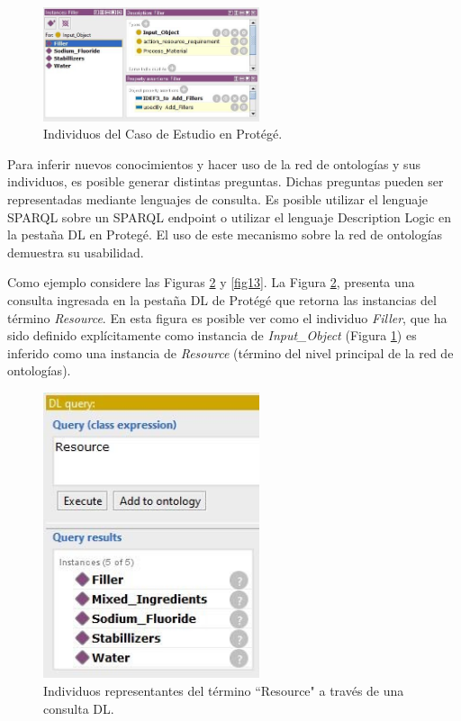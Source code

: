 \documentclass[journal]{IEEEtran}
\begin{document}
\begin{figure}[!t]
\centering
\includegraphics[width=2.5in]{figures/figure11.jpg}
\caption{Individuos del Caso de Estudio en Prot\'eg\'e.}
\label{fig11}
\end{figure}

Para inferir nuevos conocimientos y hacer uso de la red de ontolog\'ias y sus individuos, es posible generar distintas preguntas. Dichas preguntas pueden ser representadas mediante lenguajes de consulta. Es posible utilizar el lenguaje SPARQL sobre un SPARQL endpoint o utilizar el lenguaje Description Logic en la pestaña DL en Proteg\'e. El uso de este mecanismo sobre la red de ontolog\'ias demuestra su usabilidad. 

Como ejemplo considere las Figuras \ref{fig12} y \ref{fig13}. La Figura \ref{fig12}, presenta una consulta ingresada en la pestaña DL de Prot\'eg\'e que retorna las instancias del t\'ermino \emph{Resource}. En esta figura es posible ver como el individuo \emph{Filler}, que ha sido definido expl\'icitamente como instancia de \emph{Input\_Object} (Figura \ref{fig11}) es inferido como una instancia de \emph{Resource} (t\'ermino del nivel principal de la red de ontolog\'ias).


\begin{figure}[!t]
\centering
\includegraphics[width=2.5in]{figures/figure12.jpg}
\caption{Individuos representantes del t\'ermino ``Resource" a trav\'es de una consulta DL.}
\label{fig12}
\end{figure}
\end{document}
